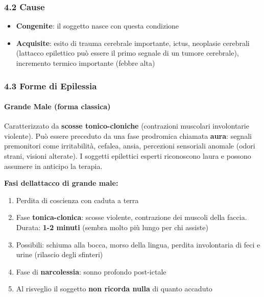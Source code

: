 \documentclass[a4paper,11pt]{article}
\providecommand{\tightlist}{%
  \setlength{\itemsep}{0pt}\setlength{\parskip}{0pt}}
\begin{document}
\subsubsection{4.2 Cause}\label{cause}

\begin{itemize}
      \tightlist
      \item
            \textbf{Congenite}: il soggetto nasce con questa condizione
      \item
            \textbf{Acquisite}: esito di trauma cerebrale importante, ictus,
            neoplasie cerebrali (l\textquotesingle attacco epilettico può essere
            il primo segnale di un tumore cerebrale), incremento termico
            importante (febbre alta)
\end{itemize}

\subsubsection{4.3 Forme di Epilessia}\label{forme-di-epilessia}

\paragraph{Grande Male (forma
      classica)}\label{grande-male-forma-classica}

Caratterizzato da \textbf{scosse tonico-cloniche} (contrazioni muscolari
involontarie violente). Può essere preceduto da una fase prodromica
chiamata \textbf{aura}: segnali premonitori come irritabilità, cefalea,
ansia, percezioni sensoriali anomale (odori strani, visioni alterate). I
soggetti epilettici esperti riconoscono l\textquotesingle aura e possono
assumere in anticipo la terapia.

\textbf{Fasi dell\textquotesingle attacco di grande male:}

\begin{enumerate}
      \tightlist
      \item
            Perdita di coscienza con caduta a terra
      \item
            Fase \textbf{tonica-clonica}: scosse violente, contrazione dei muscoli
            della faccia. Durata: \textbf{1-2 minuti} (sembra molto più lungo per
            chi assiste)
      \item
            Possibili: schiuma alla bocca, morso della lingua, perdita
            involontaria di feci e urine (rilascio degli sfinteri)
      \item
            Fase di \textbf{narcolessia}: sonno profondo post-ictale
      \item
            Al risveglio il soggetto \textbf{non ricorda nulla} di quanto accaduto
\end{enumerate}
\end{document}
